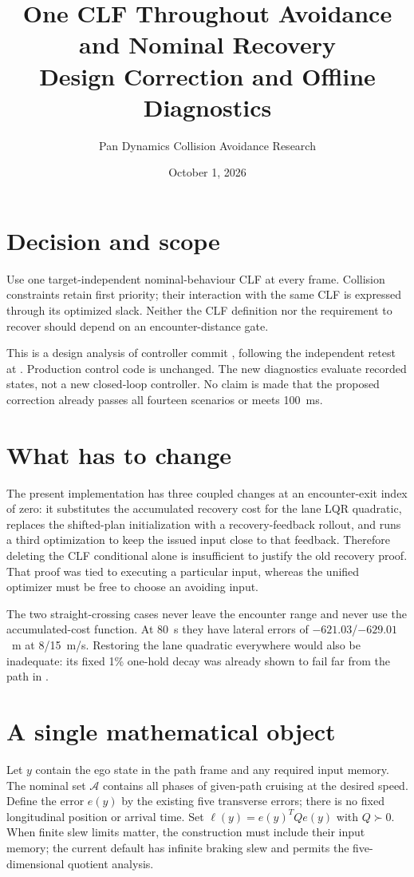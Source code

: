 \documentclass[11pt]{article}
\title{One CLF Throughout Avoidance and Nominal Recovery\\Design Correction and Offline Diagnostics}
\author{Pan Dynamics Collision Avoidance Research}
\date{October 1, 2026}
\begin{document}
\maketitle
\section{Decision and scope}
Use one target-independent nominal-behaviour CLF at every frame. Collision
constraints retain first priority; their interaction with the same CLF is
expressed through its optimized slack. Neither the CLF definition nor the
requirement to recover should depend on an encounter-distance gate.

This is a design analysis of controller commit
, following the independent retest
at . Production control code is
unchanged. The new diagnostics evaluate recorded states, not a new closed-loop
controller. No claim is made that the proposed correction already passes all
fourteen scenarios or meets 100~ms.

\section{What has to change}
The present implementation has three coupled changes at an encounter-exit
index of zero: it substitutes the accumulated recovery cost for the lane LQR
quadratic, replaces the shifted-plan initialization with a recovery-feedback
rollout, and runs a third optimization to keep the issued input close to that
feedback. Therefore deleting the CLF conditional alone is insufficient to
justify the old recovery proof. That proof was tied to executing a particular
input, whereas the unified optimizer must be free to choose an avoiding input.

The two straight-crossing cases never leave the encounter range and never use
the accumulated-cost function. At 80~s they have lateral errors of
$-621.03$/$-629.01$~m at 8/15~m/s. Restoring the lane quadratic everywhere would
also be inadequate: its fixed 1\% one-hold decay was already shown to fail far
from the path in .

\section{A single mathematical object}
Let $y$ contain the ego state in the path frame and any required input memory.
The nominal set $\mathcal A$ contains all phases of given-path cruising at the
desired speed. Define the error $e(y)$ by the existing five transverse errors;
there is no fixed longitudinal position or arrival time. Set
$\ell(y)=e(y)^TQe(y)$ with $Q\succ0$. When finite slew limits matter, the
construction must include their input memory; the current default has infinite
braking slew and permits the five-dimensional quotient analysis.
\end{document}
